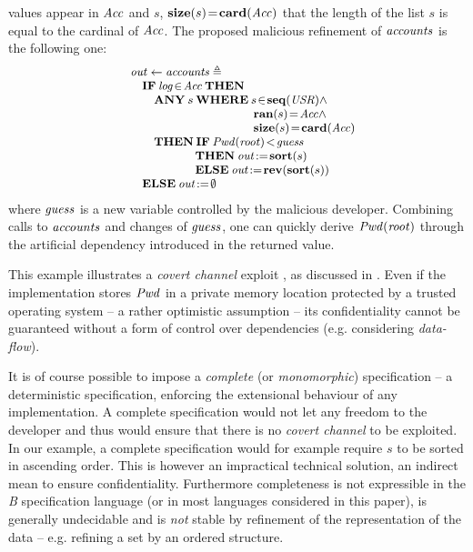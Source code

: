 \documentclass[conference]{IEEEtran}
\begin{document}
values appear in {\small$\textrm{\emph{Acc}}$} and {\small$s$},
{\small$\mathbf{size}(s)\!=\!\mathbf{card}(\textrm{\emph{Acc}})$} that the length of the list
{\small$s$} is equal to the cardinal of {\small$\textrm{\emph{Acc}}$}. The proposed malicious refinement
of {\small$\textrm{\emph{accounts}}$} is the following one:
\[\small\begin{array}{l}
\quad \fid{out}\gets\fid{accounts}\triangleq\\
\quad\quad\Cmd{IF}\:\fid{log}\!\in\!\fid{Acc}\:\Cmd{THEN}\\
\quad\quad\quad\Cmd{ANY}\:s\:\Cmd{WHERE}\:s\!\in\!\Cmd{seq}(\fid{USR})\land\\
\quad\quad\quad\quad\quad\quad\quad\quad\quad\quad\quad\:\:
                                          \Cmd{ran}(s)\!=\!\fid{Acc}\land\\
\quad\quad\quad\quad\quad\quad\quad\quad\quad\quad\quad\:\:
                                          \Cmd{size}(s)\!=\!\Cmd{card}(\fid{Acc})\\
\quad\quad\quad\Cmd{THEN}\:\Cmd{IF}\:\fid{Pwd}(\fid{root})\!<\!\fid{guess}\\
\quad\quad\quad\quad\quad\quad\:\:\:\!
\Cmd{THEN}\:\fid{out}\!:=\!\Cmd{sort}(s)\\
\quad\quad\quad\quad\quad\quad\:\:\:\!
\Cmd{ELSE}\:\fid{out}\!:=\!\Cmd{rev}(\Cmd{sort}(s))\\
\quad\quad\Cmd{ELSE}\:\fid{out}\!:=\!\emptyset\\
\end{array}\]
where {\small$\textrm{\emph{guess}}$} is a new variable controlled by the malicious developer.
Combining calls to {\small$\textrm{\emph{accounts}}$} and changes of {\small$\textrm{\emph{guess}}$}, one can
quickly derive {\small$\textrm{\emph{Pwd}}(\textrm{\emph{root}})$} through the artificial dependency introduced in
the returned value.

This example illustrates a \emph{covert channel} exploit \cite{DBLP:journals/cacm/Lampson73},
as discussed in \cite{breakingmodel}. Even if the implementation stores {\small$\textrm{\emph{Pwd}}$} in
a private memory location protected by a trusted operating system -- a rather optimistic
assumption -- its confidentiality cannot be guaranteed without a form of control over
dependencies (e.g. considering \emph{data-flow}).

It is of course possible to impose a \emph{complete} (or \emph{monomorphic}) specification
\cite{schonegge-proof} -- a deterministic specification, enforcing the extensional behaviour
of any implementation. A complete specification would not let any freedom to the developer
and thus would ensure that there is no \emph{covert channel} to be exploited. In our example,
a complete specification would for example require {\small$s$} to be sorted in ascending
order. This is however an impractical technical solution, an indirect mean to ensure
confidentiality. Furthermore completeness is not expressible in the \emph{B} specification
language (or in most languages considered in this paper), is generally undecidable and is
\emph{not} stable by refinement of the representation of the data -- e.g. refining a set by an
ordered structure.
\end{document}
